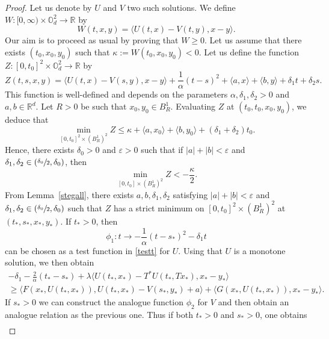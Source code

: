 \documentclass[JEP,XML,SOM,Unicode,NoEqCountersInSection,published]{cedram}
\let\epsilon\varepsilon
\theoremstyle{definition}
\begin{document}
\begin{proof}
Let us denote by $U$ and $V$ two such solutions. We define \hbox{$W: [0,\infty)\!\times\!\mathbb{O}_d^2\!\to\!\mathbb{R}$} by
\begin{equation*}
W(t,x,y) = \langle U(t,x)-V(t,y), x- y \rangle.
\end{equation*}
Our aim is to proceed as usual by proving that $W \geq 0$. Let us assume that there exists $(t_0,x_0,y_0)$ such that $\kappa:= W(t_0,x_0,y_0) < 0$. Let us define the function \hbox{$Z: [0,t_0]^2 \times \mathbb{O}_d^2 \to \mathbb{R}$} by
\begin{equation*}
Z(t,s,x,y) = \langle U(t,x)-V(s,y),x-y \rangle+\frac{1}{\alpha}(t-s)^2+\langle a , x\rangle+\langle b,y\rangle+\delta_1 t+\delta_2 s.
\end{equation*}
This function is well-defined and depends on the parameters $\alpha,\delta_1,\delta_2\!>\!0$ and $a,b\!\in\!\mathbb{R}^d$. Let $R > 0$ be such that $x_0,y_0 \in B^1_R$. Evaluating $Z$ at $(t_0,t_0,x_0,y_0)$, we deduce that
\[
\min_{[0,t_0]^2\times (B^1_R)^2} Z \leq \kappa+\langle a , x_0\rangle+\langle b,y_0\rangle+(\delta_1+\delta_2) t_0.
\]
Hence, there exists $\delta_0 > 0$ and $\epsilon > 0$ such that if $|a|+|b| < \epsilon$ and $\delta_1,\delta_2 \in(\sfrac{\delta_0}{2}, \delta_0)$, then
\begin{equation}\label{hypwrong}
\min_{[0,t_0]\times (B^1_R)^2} Z < -\frac{\kappa}{2}.
\end{equation}
From Lemma~\ref{stegall}, there exists $a,b,\delta_1, \delta_2$ satisfying $|a|+|b| < \epsilon$ and $\delta_1,\delta_2 \in(\sfrac{\delta_0}{2}, \delta_0)$ such that $Z$ has a strict minimum on $[0,t_0]^2 \times (B^1_R)^2$ at $(t_*,s_*,x_*,y_*)$. If $t_*> 0$, then
\begin{equation*}
\phi_1: t \to-\frac{1}{\alpha}(t-s_*)^2-\delta_1 t
\end{equation*}
can be chosen as a test function in \eqref{testt} for $U$. Using that $U$ is a monotone solution, we then obtain
\begin{multline*}
- \delta_1- \frac{2}{\alpha}(t_*-s_*)+\lambda \langle U(t_*,x_*)-T^*U(t_*,Tx_*),x_*-y_* \rangle \\
\geq
\langle F(x_*,U(t_*,x_*)), U(t_*,x_*)-V(s_*,y_*)+a\rangle+\langle G(x_*,U(t_*,x_*)), x_*-y_* \rangle.
\end{multline*}
If $s_* > 0$ we can construct the analogue function $\phi_2$ for $V$ and then obtain an analogue relation as the previous one. Thus if both $t_* > 0 $ and $s_* > 0$, one obtains
\begin{multline}\label{int47}

\end{multline}
\end{proof}
\end{document}
